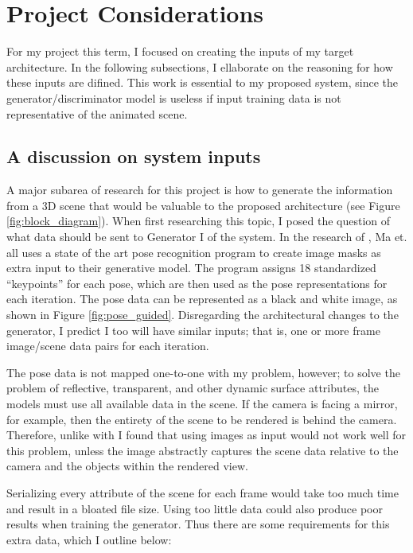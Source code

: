 \documentclass[conference]{IEEEtran}
\begin{document}
\section{Project Considerations}
\label{sec:considerations}
For my project this term, I focused on creating the inputs of my target
architecture. In the following subsections, I ellaborate
on the reasoning for how these inputs are difined. This work is essential to my
proposed system, since the generator/discriminator model is useless if input
training data is not representative of the animated scene.

\subsection{A discussion on system inputs}
\label{subsec:inputs}
A major subarea of research for this project is how to generate the
information from a 3D scene that would be valuable to the proposed architecture
(see Figure \ref{fig:block_diagram}).
When first researching this topic, I posed the question of what
data should be sent to Generator I of the system.
In the research of \cite{ref:pose_guided},
Ma et. all uses a state of the art pose recognition program to
create image masks as extra input to their generative model.
The program assigns 18 standardized ``keypoints'' for each pose,
which are then used as the pose representations for each iteration.
The pose data can be represented as a black and white image,
as shown in Figure \ref{fig:pose_guided}.
Disregarding the architectural changes to the generator, I predict I too will
have similar inputs; that is, one or more frame image/scene data pairs for each iteration.

The pose data is not mapped one-to-one with my problem, however;
to solve the problem of reflective, transparent, and other dynamic surface
attributes, the models must use all available data in the scene.
If the camera is facing a mirror, for example,
then the entirety of the scene to be rendered is behind the camera.
Therefore, unlike with \cite{ref:pose_guided}
I found that using images as input would not work well for this problem,
unless the image abstractly captures the scene data relative to the camera and
the objects within the rendered view.

Serializing every attribute of the scene for each frame would take too much time
and result in a bloated file size.
Using too little data could also produce poor results when training the
generator. Thus there are some requirements for this extra data, which I
outline below:
\end{document}
